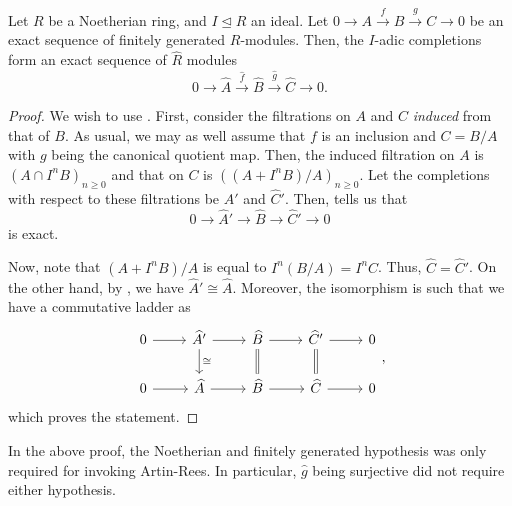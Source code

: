 \begin{prop} \label{prop:noetherian-I-adic-completion-exact}
	Let $R$ be a Noetherian ring, and $I \unlhd R$ an ideal. Let $0 \to A \xrightarrow{f} B \xrightarrow{g} C \to 0$ be an exact sequence of finitely generated $R$-modules. Then, the $I$-adic completions form an exact sequence of $\widehat{R}$ modules
	\begin{equation*} 
		0 \to \widehat{A} \xrightarrow{\widehat{f}} \widehat{B} \xrightarrow{\widehat{g}} \widehat{C} \to 0.
	\end{equation*}
\end{prop}
\begin{proof} 
	We wish to use . First, consider the filtrations on $A$ and $C$ \emph{induced} from that of $B$. As usual, we may as well assume that $f$ is an inclusion and $C = B/A$ with $g$ being the canonical quotient map. Then, the induced filtration on $A$ is $(A \cap I^{n} B)_{n \ge 0}$ and that on $C$ is $((A + I^{n} B)/A)_{n \ge 0}$. Let the completions with respect to these filtrations be $\widehat{A}'$ and $\widehat{C}'$. Then,  tells us that
	\begin{equation*} 
		0 \to \widehat{A}' \to \widehat{B} \to \widehat{C}' \to 0
	\end{equation*}
	is exact. 

	Now, note that $(A + I^{n} B)/A$ is equal to $I^{n} (B/A) = I^{n} C$. Thus, $\widehat{C} = \widehat{C}'$. \newline
	On the other hand, by , we have $\widehat{A}' \cong \widehat{A}$. Moreover, the isomorphism is such that we have a commutative ladder as
	\begin{equation*} 
		\begin{tikzcd}
			0 \arrow[r] & \widehat{A}' \arrow[d, "\cong"] \arrow[r] & \widehat{B} \arrow[d, equals] \arrow[r] & \widehat{C}' \arrow[d, equals] \arrow[r] & 0 \\
			0 \arrow[r] & \widehat{A} \arrow[r] & \widehat{B} \arrow[r] & \widehat{C} \arrow[r] & 0
		\end{tikzcd},
	\end{equation*}
	which proves the statement.
\end{proof}

\begin{rem} \label{rem:noetherian-I-adic-completion-exact}
	In the above proof, the Noetherian and finitely generated hypothesis was only required for invoking Artin-Rees. In particular, $\widehat{g}$ being surjective did not require either hypothesis.
\end{rem}


